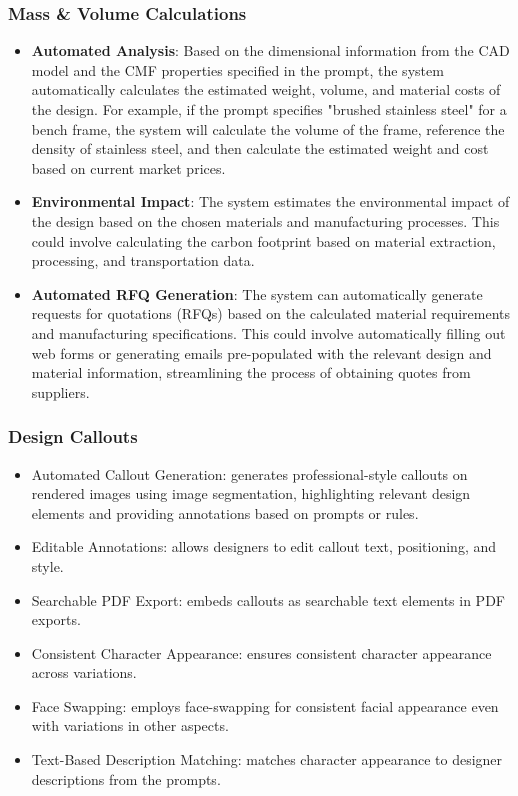 \documentclass[12pt]{report}
\begin{document}
\subsubsection{Mass \& Volume Calculations}
\begin{itemize}
\item \textbf{Automated Analysis}: Based on the dimensional information from the CAD model and the CMF properties specified in the prompt, the system automatically calculates the estimated weight, volume, and material costs of the design. For example, if the prompt specifies "brushed stainless steel" for a bench frame, the system will calculate the volume of the frame, reference the density of stainless steel, and then calculate the estimated weight and cost based on current market prices.
\item \textbf{Environmental Impact}: The system estimates the environmental impact of the design based on the chosen materials and manufacturing processes. This could involve calculating the carbon footprint based on material extraction, processing, and transportation data. 
\item \textbf{Automated RFQ Generation}: The system can automatically generate requests for quotations (RFQs) based on the calculated material requirements and manufacturing specifications. This could involve automatically filling out web forms or generating emails pre-populated with the relevant design and material information, streamlining the process of obtaining quotes from suppliers.
\end{itemize}

\subsubsection{Design Callouts}
\begin{itemize}
    \item Automated Callout Generation: generates professional-style callouts on rendered images using image segmentation, highlighting relevant design elements and providing annotations based on prompts or rules. 
    \item Editable Annotations: allows designers to edit callout text, positioning, and style.
    \item Searchable PDF Export: embeds callouts as searchable text elements in PDF exports.
\end{itemize}

\begin{itemize}
    \item Consistent Character Appearance: ensures consistent character appearance across variations.
    \item Face Swapping: employs face-swapping for consistent facial appearance even with variations in other aspects.
    \item Text-Based Description Matching: matches character appearance to designer descriptions from the prompts.
\end{itemize}
\end{document}
